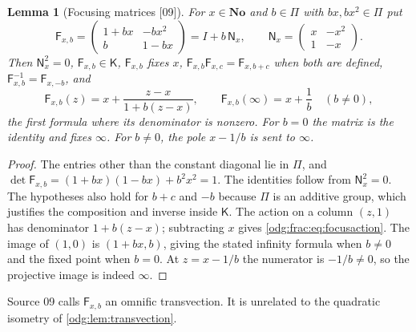 \documentclass[11pt,oneside]{article}
\numberwithin{equation}{section}
\newtheorem{lemma}[lemma]{Lemma}
\theoremstyle{definition}
\theoremstyle{remark}
\newcommand{\No}{\mathbf{No}}
\newcommand{\src}[1]{\textup{\textsf{\small[#1]}}}
\newcommand{\Kcong}{\mathsf K}
\begin{document}
\begin{lemma}[Focusing matrices \src{09}]\label{odg:frac:lem:focusmatrix}
For $x\in\No$ and $b\in\Pi$ with $bx,bx^2\in\Pi$ put
\[
 \mathsf F_{x,b}=\begin{pmatrix}1+bx&-bx^2\\ b&1-bx\end{pmatrix}
 =I+b\,\mathsf N_x,\qquad
 \mathsf N_x=\begin{pmatrix}x&-x^2\\1&-x\end{pmatrix}.
\]
Then $\mathsf N_x^2=0$, $\mathsf F_{x,b}\in\Kcong$, $\mathsf F_{x,b}$ fixes $x$,
$\mathsf F_{x,b}\mathsf F_{x,c}=\mathsf F_{x,b+c}$ when both are defined,
$\mathsf F_{x,b}^{-1}=\mathsf F_{x,-b}$, and
\begin{equation}\label{odg:frac:eq:focusaction}
 \mathsf F_{x,b}(z)=x+\frac{z-x}{1+b(z-x)},\qquad
 \mathsf F_{x,b}(\infty)=x+\frac1b\quad(b\ne0),
\end{equation}
the first formula where its denominator is nonzero. For $b=0$ the matrix is
the identity and fixes $\infty$. For $b\ne0$, the pole $x-1/b$ is sent
to $\infty$.
\end{lemma}
\begin{proof}
The entries other than the constant diagonal lie in $\Pi$, and
$\det\mathsf F_{x,b}=(1+bx)(1-bx)+b^2x^2=1$. The identities follow from
$\mathsf N_x^2=0$. The hypotheses also hold for $b+c$ and $-b$ because
$\Pi$ is an additive group, which justifies the composition and inverse
inside $\Kcong$. The action on a column $(z,1)$ has denominator
$1+b(z-x)$; subtracting $x$ gives \eqref{odg:frac:eq:focusaction}.
The image of $(1,0)$ is $(1+bx,b)$, giving the stated infinity formula
when $b\ne0$ and the fixed point when $b=0$. At $z=x-1/b$ the numerator
is $-1/b\ne0$, so the projective image is indeed $\infty$.
\end{proof}

Source 09 calls $\mathsf F_{x,b}$ an omnific transvection. It is unrelated to
the quadratic isometry of \cref{odg:lem:transvection}.
\end{document}
